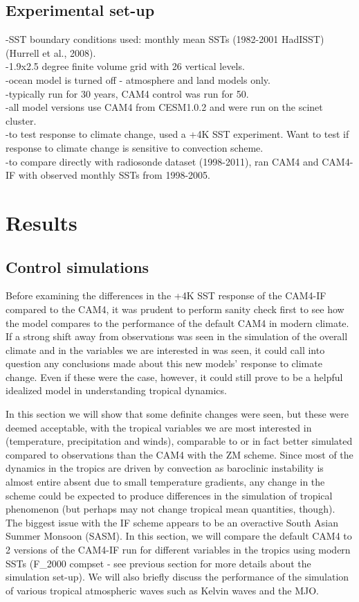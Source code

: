\documentclass[letterpaper,12pt,titlepage,oneside,final]{book}
\begin{document}
\section{Experimental set-up}
-SST boundary conditions used: monthly mean SSTs (1982-2001 HadISST) (Hurrell et al., 2008).
\\
-1.9x2.5 degree finite volume grid with 26 vertical levels.
\\
-ocean model is turned off - atmosphere and land models only.
\\
-typically run for 30 years, CAM4 control was run for 50. 
\\
-all model versions use CAM4 from CESM1.0.2 and were run on the scinet cluster.
\\
-to test response to climate change, used a +4K SST experiment. Want to test if response to climate change is sensitive to convection scheme.
\\
-to compare directly with radiosonde dataset (1998-2011), ran CAM4 and CAM4-IF with observed monthly SSTs from 1998-2005. 
\chapter{Results}
\section{Control simulations}
Before examining the differences in the +4K SST response of the CAM4-IF compared to the CAM4, it was prudent to perform sanity check first to see how the model compares to the performance of the default CAM4 in modern climate. If a strong shift away from observations was seen in the simulation of the overall climate and in the variables we are interested in was seen, it could call into question any conclusions made about this new models' response to climate change. Even if these were the case, however, it could still prove to be a helpful idealized model in understanding tropical dynamics. 

In this section we will show that some definite changes were seen, but these were deemed acceptable, with the tropical variables we are most interested in (temperature, precipitation and winds), comparable to or in fact better simulated compared to observations than the CAM4 with the ZM scheme. Since most of the dynamics in the tropics are driven by convection as baroclinic instability is almost entire absent due to small temperature gradients, any change in the scheme could be expected to produce differences in the simulation of tropical phenomenon (but perhaps may not change tropical mean quantities, though). The biggest issue with the IF scheme appears to be an overactive South Asian Summer Monsoon (SASM). In this section, we will compare the default CAM4 to 2 versions of the CAM4-IF run for different variables in the tropics using modern SSTs (F\_2000 compset - see previous section for more details about the simulation set-up). We will also briefly discuss the performance of the simulation of various tropical atmospheric waves such as Kelvin waves and the MJO. 
\end{document}
